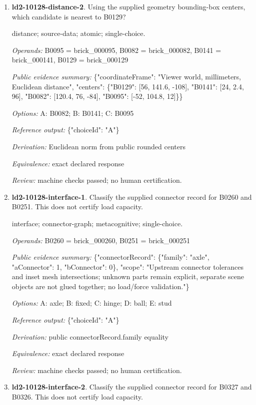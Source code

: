 \begin{enumerate}
\item \textbf{ld2-10128-distance-2}. Using the supplied geometry bounding-box centers, which candidate is nearest to B0129?
\par{\small distance; source-data; atomic; single-choice.\par\textit{Operands:} B0095 = brick\_000095, B0082 = brick\_000082, B0141 = brick\_000141, B0129 = brick\_000129\par\textit{Public evidence summary:} \{"coordinateFrame": "Viewer world, millimeters, Euclidean distance", "centers": \{"B0129": [56, 141.6, -108], "B0141": [24, 2.4, 96], "B0082": [120.4, 76, -84], "B0095": [-52, 104.8, 12]\}\}\par\textit{Options:} A: B0082; B: B0141; C: B0095\par\textit{Reference output:} \{"choiceId": "A"\}\par\textit{Derivation:} Euclidean norm from public rounded centers\par\textit{Equivalence:} exact declared response\par\textit{Review:} machine checks passed; no human certification.}
\item \textbf{ld2-10128-interface-1}. Classify the supplied connector record for B0260 and B0251. This does not certify load capacity.
\par{\small interface; connector-graph; metacognitive; single-choice.\par\textit{Operands:} B0260 = brick\_000260, B0251 = brick\_000251\par\textit{Public evidence summary:} \{"connectorRecord": \{"family": "axle", "aConnector": 1, "bConnector": 0\}, "scope": "Upstream connector tolerances and inset mesh intersections; unknown parts remain explicit, separate scene objects are not glued together; no load/force validation."\}\par\textit{Options:} A: axle; B: fixed; C: hinge; D: ball; E: stud\par\textit{Reference output:} \{"choiceId": "A"\}\par\textit{Derivation:} public connectorRecord.family equality\par\textit{Equivalence:} exact declared response\par\textit{Review:} machine checks passed; no human certification.}
\item \textbf{ld2-10128-interface-2}. Classify the supplied connector record for B0327 and B0326. This does not certify load capacity.

\end{enumerate}
